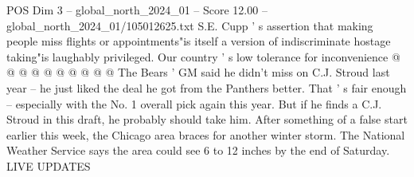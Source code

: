 \begin{textsample}{POS Dim 3 – global\_north\_2024\_01 – Score 12.00 – global\_north\_2024\_01/105012625.txt}
S.E.
Cupp ' s assertion that making people miss flights or appointments"is itself a version of indiscriminate hostage taking"is laughably privileged.
Our country ' s low tolerance for inconvenience @ @ @ @ @ @ @ @ @ @ The Bears ' GM said he didn't miss on C.J.
Stroud last year -- he just liked the deal he got from the Panthers better.
That ' s fair enough -- especially with the No. 1 overall pick again this year.
But if he finds a C.J.
Stroud in this draft, he probably should take him.
After something of a false start earlier this week, the Chicago area braces for another winter storm.
The National Weather Service says the area could see 6 to 12 inches by the end of Saturday.
LIVE UPDATES

\end{textsample}
